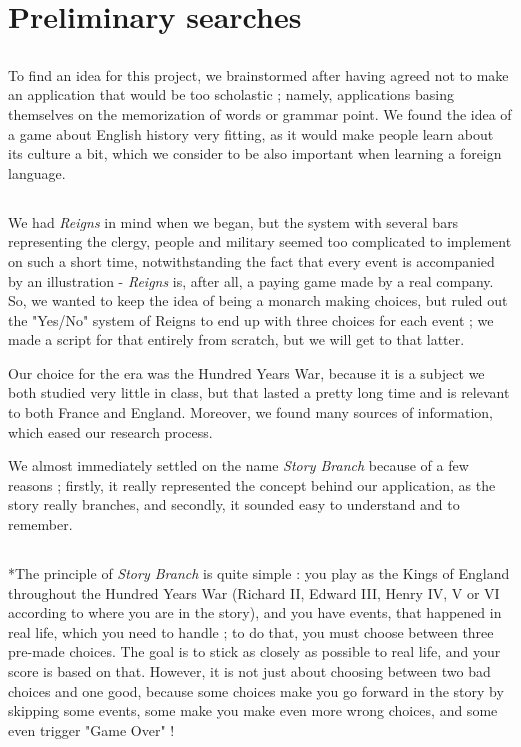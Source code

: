 \documentclass{scrreprt}
\begin{document}
\section{Preliminary searches}

\subsection*{}To find an idea for this project, we brainstormed after having agreed not to make an application that would be too scholastic ; namely, applications basing themselves on the memorization of words or grammar point. We found the idea of a game about English history very fitting, as it would make people learn about its culture a bit, which we consider to be also important when learning a foreign language. 

\subsection*{} We had \textit{Reigns} in mind when we began, but the system with several bars representing the clergy, people and military seemed too complicated to implement on such a short time, notwithstanding the fact that every event is accompanied by an illustration - \textit{Reigns} is, after all, a paying game made by a real company. So, we wanted to keep the idea of being a monarch making choices, but ruled out the "Yes/No" system of Reigns to end up with three choices for each event ; we made a script for that entirely from scratch, but we will get to that latter.

Our choice for the era was the Hundred Years War, because it is a subject we both studied very little in class, but that lasted a pretty long time and is relevant to both France and England. Moreover, we found many sources of information, which eased our research process.

We almost immediately settled on the name \textit{Story Branch} because of a few reasons ; firstly, it really represented the concept behind our application, as the story really branches, and secondly, it sounded easy to understand and to remember.

\subsection{}*The principle of \textit{Story Branch} is quite simple : you play as the Kings of England throughout the Hundred Years War (Richard II, Edward III, Henry IV, V or VI according to where you are in the story), and you have events, that happened in real life, which you need to handle ; to do that, you must choose between three pre-made choices. The goal is to stick as closely as possible to real life, and your score is based on that. However, it is not just about choosing between two bad choices and one good, because some choices make you go forward in the story by skipping some events, some make you make even more wrong choices, and some even trigger "Game Over" !
\end{document}
